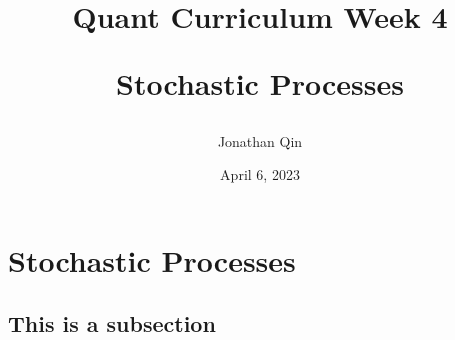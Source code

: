 \documentclass{article}
\title{

\begin{center} \textbf{Quant Curriculum Week 4}

Stochastic Processes \end{center}
}
\author{Jonathan Qin}
\date{April 6, 2023}
\begin{document}
\maketitle

\section{Stochastic Processes}

\subsection{This is a subsection}
\end{document}
